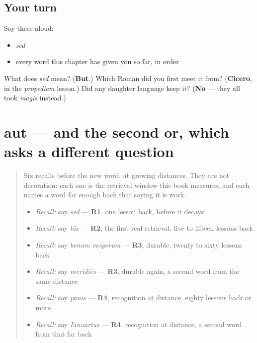\subsection*{Your turn}
Say these aloud:

\begin{itemize}
\raggedright
  \item \emph{sed}
  \item every word this chapter has given you so far, in order
\end{itemize}

\begin{tcolorbox}[breakable,colback=teal!4,colframe=teal!35!black,title={Before you move on}]
What does \emph{sed} mean? (\textbf{But}.) Which Roman did you first meet it from? (\textbf{Cicero}, in the \emph{propediem} lesson.) Did any daughter language keep it? (\textbf{No} — they all took \emph{magis} instead.)
\end{tcolorbox}
\section[aut]{aut — and the second or, which asks a different question}

\label{lesson:LA-C48-aut}



\begin{quote}
Six recalls before the new word, at growing distances. They are not decoration: each one is the retrieval window this book measures, and each names a word far enough back that saying it is work.

\begin{itemize}
\raggedright
  \item \emph{Recall:} say \emph{sed} — \textbf{R1}, one lesson back, before it decays
  \item \emph{Recall:} say \emph{lūx} — \textbf{R2}, the first real retrieval, five to fifteen lessons back
  \item \emph{Recall:} say \emph{bonum vesperum} — \textbf{R3}, durable, twenty to sixty lessons back
  \item \emph{Recall:} say \emph{merīdiēs} — \textbf{R3}, durable again, a second word from the same distance
  \item \emph{Recall:} say \emph{pānis} — \textbf{R4}, recognition at distance, eighty lessons back or more
  \item \emph{Recall:} say \emph{Iānuārius} — \textbf{R4}, recognition at distance, a second word from that far back
\end{itemize}
\end{quote}

